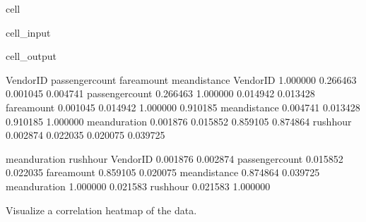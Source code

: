 \documentclass[letterpaper,10pt,english]{sphinxmanual}
\begin{document}
\begin{sphinxuseclass}{cell}
\begin{sphinxuseclass}{cell_input}
\begin{sphinxVerbatim}[commandchars=\\\{\}]
\end{sphinxVerbatim}

\end{sphinxuseclass}
\begin{sphinxuseclass}{cell_output}
\begin{sphinxVerbatim}[commandchars=\\\{\}]
                 VendorID  passenger\PYGZus{}count  fare\PYGZus{}amount  mean\PYGZus{}distance  \PYGZbs{}
VendorID         1.000000         0.266463     0.001045       0.004741   
passenger\PYGZus{}count  0.266463         1.000000     0.014942       0.013428   
fare\PYGZus{}amount      0.001045         0.014942     1.000000       0.910185   
mean\PYGZus{}distance    0.004741         0.013428     0.910185       1.000000   
mean\PYGZus{}duration    0.001876         0.015852     0.859105       0.874864   
rush\PYGZus{}hour       \PYGZhy{}0.002874        \PYGZhy{}0.022035    \PYGZhy{}0.020075      \PYGZhy{}0.039725   

                 mean\PYGZus{}duration  rush\PYGZus{}hour  
VendorID              0.001876  \PYGZhy{}0.002874  
passenger\PYGZus{}count       0.015852  \PYGZhy{}0.022035  
fare\PYGZus{}amount           0.859105  \PYGZhy{}0.020075  
mean\PYGZus{}distance         0.874864  \PYGZhy{}0.039725  
mean\PYGZus{}duration         1.000000  \PYGZhy{}0.021583  
rush\PYGZus{}hour            \PYGZhy{}0.021583   1.000000  
\end{sphinxVerbatim}

\end{sphinxuseclass}
\end{sphinxuseclass}
\sphinxAtStartPar
Visualize a correlation heatmap of the data.
\end{document}
